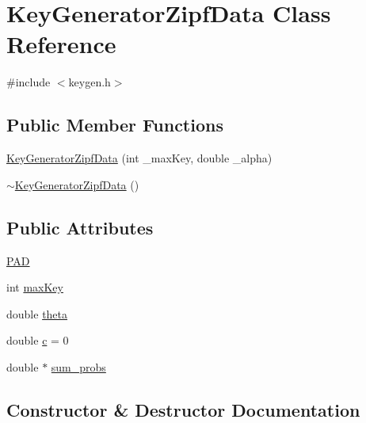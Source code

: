 \hypertarget{classKeyGeneratorZipfData}{}\section{Key\+Generator\+Zipf\+Data Class Reference}
\label{classKeyGeneratorZipfData}


{\ttfamily \#include $<$keygen.\+h$>$}

\subsection*{Public Member Functions}
\begin{DoxyCompactItemize}
\item 
\hyperlink{classKeyGeneratorZipfData_a5cf6242078ed7f948bf704306845fef1}{Key\+Generator\+Zipf\+Data} (int \+\_\+max\+Key, double \+\_\+alpha)
\item 
\hyperlink{classKeyGeneratorZipfData_ad94d584fa6cb346ce92eb62cffa96a81}{$\sim$\+Key\+Generator\+Zipf\+Data} ()
\end{DoxyCompactItemize}
\subsection*{Public Attributes}
\begin{DoxyCompactItemize}
\item 
\hyperlink{classKeyGeneratorZipfData_a7ff0c507086702a0c51b213524f26446}{P\+AD}
\item 
int \hyperlink{classKeyGeneratorZipfData_a805aeddf50b3b55fee05eb9915e96980}{max\+Key}
\item 
double \hyperlink{classKeyGeneratorZipfData_ad129612d274af9efebd5c11216f3df07}{theta}
\item 
double \hyperlink{classKeyGeneratorZipfData_a1124439733cea718670b0e87d094b0bb}{c} = 0
\item 
double $\ast$ \hyperlink{classKeyGeneratorZipfData_abaa12ba6ff7356d60e090d3c6bb1a434}{sum\+\_\+probs}
\end{DoxyCompactItemize}


\subsection{Constructor \& Destructor Documentation}
\mbox{\label{classKeyGeneratorZipfData_a5cf6242078ed7f948bf704306845fef1}} 
